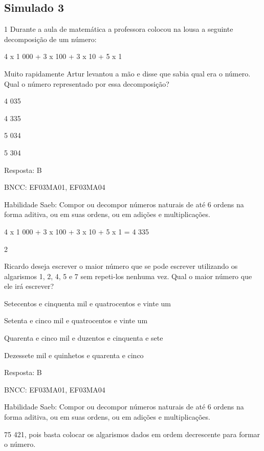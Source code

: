 \begin{escolha}
\begin{escolha}
\chapter{Simulado 3}

\num{1} Durante a aula de matemática a professora colocou na lousa
a seguinte decomposição de um número:

4 x 1 000 + 3 x 100 + 3 x 10 + 5 x 1

Muito rapidamente Artur levantou a mão e disse que sabia qual era o
número. Qual o número representado por essa decomposição?

\begin{escolha}
\item
  4 035
\item
  4 335
\item
  5 034
\item
  5 304
\end{escolha}

Resposta: B

BNCC: EF03MA01, EF03MA04

Habilidade Saeb: Compor ou decompor números naturais de até 6 ordens na
forma aditiva, ou em suas ordens, ou em adições e multiplicações.

4 x 1 000 + 3 x 100 + 3 x 10 + 5 x 1 = 4 335

\num{2}

Ricardo deseja escrever o maior número que se pode escrever utilizando
os algarismos 1, 2, 4, 5 e 7 sem repeti-los nenhuma vez. Qual o maior
número que ele irá escrever?

\begin{escolha}
\item
  Setecentos e cinquenta mil e quatrocentos e vinte um
\item
  Setenta e cinco mil e quatrocentos e vinte um
\item
  Quarenta e cinco mil e duzentos e cinquenta e sete
\item
  Dezessete mil e quinhetos e quarenta e cinco
\end{escolha}

Resposta: B

BNCC: EF03MA01, EF03MA04

Habilidade Saeb: Compor ou decompor números naturais de até 6 ordens na
forma aditiva, ou em suas ordens, ou em adições e multiplicações.

75 421, pois basta colocar os algarismos dados em ordem decrescente para
formar o número.


\end{escolha}
\end{escolha}
